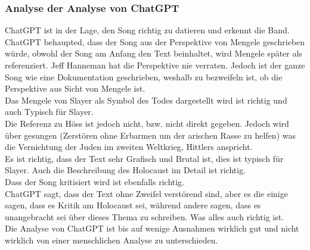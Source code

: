 \documentclass[twocolumn,10pt]{article}
\begin{document}
		\subsubsection{Analyse der Analyse von ChatGPT}
		ChatGPT ist in der Lage, den Song richtig zu datieren und erkennt die Band. ChatGPT behaupted, dass der Song aus der Perspektive von Mengele geschrieben würde, obwohl der Song am Anfang den Text  beinhaltet, wird Mengele später als  referenziert. Jeff Hanneman hat  die Perspektive nie verraten. Jedoch ist der ganze Song wie eine Dokumentation geschrieben, weshalb zu bezweifeln ist, ob die Perspektive aus Sicht von Mengele ist.\\
		Das Mengele von Slayer als Symbol des Todes dargestellt wird ist richtig und auch Typisch für Slayer.\\
		Die Referenz zu Höss ist jedoch nicht, bzw. nicht direkt gegeben. Jedoch wird über  gesungen (Zerstören ohne Erbarmen um der arischen Rasse zu helfen) was die Vernichtung der Juden im zweiten Weltkrieg, Hittlers  anspricht.\\
		Es ist richtig, dass der Text sehr Grafisch und Brutal ist, dies ist typisch für Slayer. Auch die Beschreibung des Holocaust im Detail ist richtig.\\
		Dass der Song kritisiert wird ist ebenfalls richtig.\\
		ChatGPT sagt, dass der Text ohne Zweifel verstörend sind, aber es die einige sagen, dass es Kritik am Holocaust sei, während andere sagen, dass es unangebracht sei über dieses Thema zu schreiben. Was alles auch richtig ist.\\
		Die Analyse von ChatGPT ist bis auf wenige Ausnahmen wirklich gut und nicht wirklich von einer menschlichen Analyse zu unterschieden. 
			
		\vfill
		\clearpage
\end{document}
